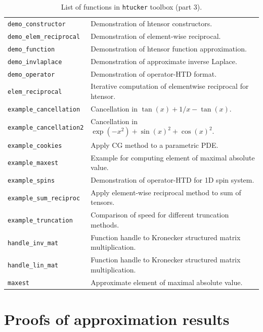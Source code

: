 \documentclass[11pt, a4paper]{article}
\newcommand{\htucker}{{\tt htucker}}
\begin{document}
\begin{preprint}
\begin{table}
\begin{tabular}{|p{4.4cm}|p{9.8cm}|}
\texttt{demo\_constructor}      & Demonstration of htensor constructors.\\
\texttt{demo\_elem\_reciprocal} & Demonstration of element-wise reciprocal.\\
\texttt{demo\_function}         & Demonstration of htensor function approximation.\\
\texttt{demo\_invlaplace}       & Demonstration of approximate inverse Laplace.\\
\texttt{demo\_operator}         & Demonstration of operator-HTD format.\\
\texttt{elem\_reciprocal}       & Iterative computation of elementwise reciprocal for htensor.\\
\texttt{example\_cancellation}  & Cancellation in $\tan(x) + 1/x - \tan(x)$.\\
\texttt{example\_cancellation2} & Cancellation in $\exp(-x^2) + \sin(x)^2 + \cos(x)^2$.\\
\texttt{example\_cookies}       & Apply CG method to a parametric PDE.\\
\texttt{example\_maxest}        & Example for computing element of maximal absolute value.\\
\texttt{example\_spins}         & Demonstration of operator-HTD for 1D spin system.\\
\texttt{example\_sum\_reciproc} & Apply element-wise reciprocal method to sum of tensors.\\
\texttt{example\_truncation}    & Comparison of speed for different truncation methods.\\
\texttt{handle\_inv\_mat}       & Function handle to Kronecker structured matrix multiplication.\\
\texttt{handle\_lin\_mat}       & Function handle to Kronecker structured matrix multiplication.\\
\texttt{maxest}                 & Approximate element of maximal absolute value.\\
\hline
\end{tabular}
  \caption{List of functions in \htucker{} toolbox (part 3).} \label{tab:htucker_functions3}
\end{table}


\newpage
\section{Proofs of approximation results} \label{sec:proofs}


\end{preprint}
\end{document}
